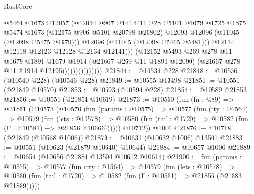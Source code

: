 \begin{lexlean}{RustCore}
\begin{coremodule}
                                      @5464
                                      @1673
                                      @12057
                                      (@12034
                                        @907
                                        @141
                                        @11
                                        @28
                                        @5101
                                        @1679
                                        @1725
                                        @1875
                                        @5474
                                        @1673
                                        (@12075 @906 @5101 @20798 @20802)
                                        @12093
                                        @12096
                                        (@11045 (@12098 @5475 @1679)))
                                      @12096
                                      (@11045 (@12098 @5465 @5481)))
                                    @12114
                                    @12118
                                    @12123
                                    @12128
                                    @12134
                                    @12141)))
                              (@12152
                                @5493
                                @269
                                @278
                                @11
                                @1679
                                @1891
                                @1679
                                @1914
                                (@21667 @269 @11 @1891 @12090)
                                (@21667 @278 @11 @1914 @12195)))))))))))))))
@21844 := @10534 @228
@21848 := @10536 (@10540 @228) (@10546 @228)
@21849 := @10555 @13498
@21851 := @10551 (@21849 @10570)
@21853 := @10593 (@10594 @228)
@21854 := @10589 @21853
@21856 := @10551 (@21854 @10619)
@21873 := @10550
    (fun (fn : @89) =>
    @21851
      (@10573
        (@10576
          (fun (params : @10575) =>
          @10577
            (fun (rty : @1564) =>
            @10579
              (fun (lets : @10578) =>
              @10580 (fun (tail : @1720) => @10582 (fun (Γ : @10581) => @21856 @10666))))))
        @10712))
    @1006
@21876 := @10718 (@21849 (@10568 @1006))
@21879 := @10631 (@10632 @1006) @13501
@21883 := @10551 (@10623 (@21879 @10640) @10644)
@21884 := @10657 @1006
@21889 := @10654 (@10656 @21884 @13504 @10612 @10614)
@21900 := fun (params : @10575) =>
  @10577
    (fun (rty : @1564) =>
    @10579
      (fun (lets : @10578) =>
      @10580 (fun (tail : @1720) => @10582 (fun (Γ : @10581) => @21856 (@21883 @21889)))))

\end{coremodule}
\end{lexlean}

